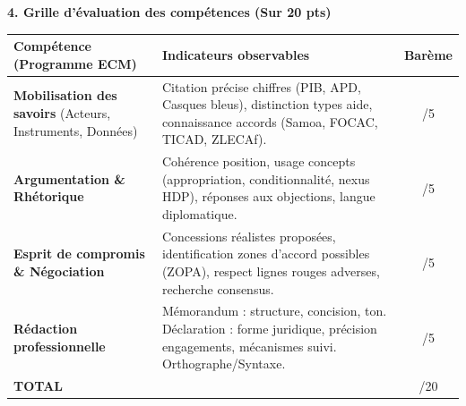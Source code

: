 \documentclass[11pt]{article}
\begin{document}
\begin{exoresolu}
\textbf{4. Grille d'évaluation des compétences (Sur 20 pts)}
\begin{center}
\begin{tabularx}{\linewidth}{|l|X|c|}\hline
\textbf{Compétence (Programme ECM)} & \textbf{Indicateurs observables} & \textbf{Barème} \\ \hline
\textbf{Mobilisation des savoirs} (Acteurs, Instruments, Données) & Citation précise chiffres (PIB, APD, Casques bleus), distinction types aide, connaissance accords (Samoa, FOCAC, TICAD, ZLECAf). & /5 \\ \hline
\textbf{Argumentation \& Rhétorique} & Cohérence position, usage concepts (appropriation, conditionnalité, nexus HDP), réponses aux objections, langue diplomatique. & /5 \\ \hline
\textbf{Esprit de compromis \& Négociation} & Concessions réalistes proposées, identification zones d'accord possibles (ZOPA), respect lignes rouges adverses, recherche consensus. & /5 \\ \hline
\textbf{Rédaction professionnelle} & Mémorandum : structure, concision, ton. Déclaration : forme juridique, précision engagements, mécanismes suivi. Orthographe/Syntaxe. & /5 \\ \hline
\textbf{TOTAL} & & /20 \\ \hline
\end{tabularx}
\end{center}
\end{exoresolu}
\end{document}
